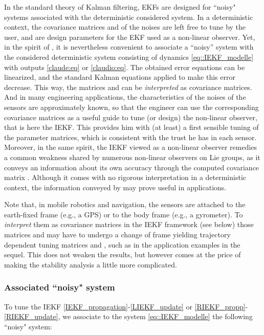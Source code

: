 \documentclass[a4paper,12pt,onecolumn]{article}
\begin{document}
In the standard theory of Kalman filtering, EKFs are designed for ``noisy" systems associated with the deterministic considered system. In a deterministic context, the covariance matrices  and  of the noises are left free to tune by the user, and are design parameters for the EKF used as  a non-linear observer. Yet, in the spirit of \cite{song-grizzle-95}, it is nevertheless convenient to  associate a ``noisy'' system with the considered deterministic system consisting of dynamics \eqref{eq::IEKF_modelle} with outputs \eqref{claude:eq} or \eqref{claudio:eq}. The obtained error equations can be linearized, and the standard Kalman equations applied to make this error decrease. This way, the matrices  and   can be \emph{interpreted} as covariance matrices. And in many engineering applications, the characteristics of the noises of the sensors are approximately known, so that the engineer can use the corresponding covariance matrices as a useful guide to tune (or design) the  non-linear observer, that is here the IEKF. This provides him with (at least) a first sensible tuning  of the parameter matrices, which is consistent with the trust he has in each sensor. Moreover,  in the same spirit, the IEKF viewed as a non-linear observer remedies a common weakness shared by numerous non-linear observers on Lie groups, as it conveys an information about its own accuracy through the computed covariance matrix . Although it comes with no rigorous interpretation in a deterministic context, the information conveyed by  may prove useful in applications. 


Note that,  in mobile robotics and navigation, the sensors are attached to the earth-fixed frame (e.g., a GPS) or to the body frame (e.g., a gyrometer). To \emph{interpret} them as covariance matrices in the IEKF framework (see below) those matrices  and  may have to undergo a change of frame yielding trajectory dependent tuning matrices  and , such as in the application examples in the sequel. This does not weaken the results, but however comes at the price of making the stability analysis a little more complicated. 



\subsubsection{Associated ``noisy" system}
To tune the IEKF \eqref{IEKF_propagation}-\eqref{LIEKF_update} or  \eqref{RIEKF_propp}-\eqref{RIEKF_update}, we associate to the system \eqref{eq::IEKF_modelle} the following
``noisy" system:
\end{document}
